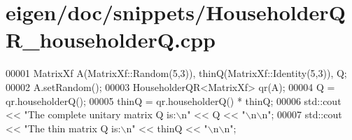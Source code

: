 \hypertarget{eigen_2doc_2snippets_2_householder_q_r__householder_q_8cpp_source}{}\section{eigen/doc/snippets/\+Householder\+Q\+R\+\_\+householderQ.cpp}
\label{eigen_2doc_2snippets_2_householder_q_r__householder_q_8cpp_source}

\begin{DoxyCode}
00001 MatrixXf A(MatrixXf::Random(5,3)), thinQ(MatrixXf::Identity(5,3)), Q;
00002 A.setRandom();
00003 HouseholderQR<MatrixXf> qr(A);
00004 Q = qr.householderQ();
00005 thinQ = qr.householderQ() * thinQ;
00006 std::cout << \textcolor{stringliteral}{"The complete unitary matrix Q is:\(\backslash\)n"} << Q << \textcolor{stringliteral}{"\(\backslash\)n\(\backslash\)n"};
00007 std::cout << \textcolor{stringliteral}{"The thin matrix Q is:\(\backslash\)n"} << thinQ << \textcolor{stringliteral}{"\(\backslash\)n\(\backslash\)n"};
\end{DoxyCode}
